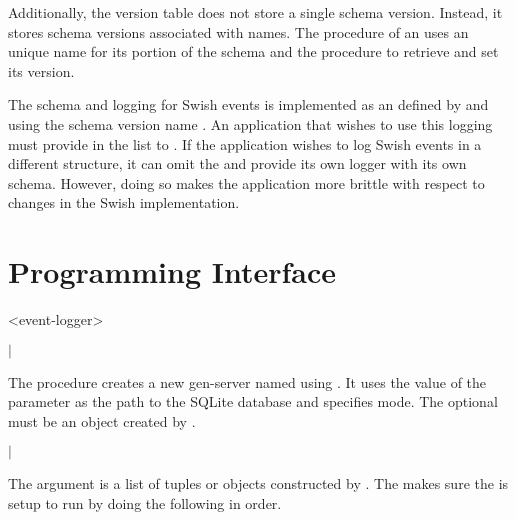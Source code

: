Additionally, the version table does not store a single schema
version. Instead, it stores schema versions associated with names. The
 procedure of an  uses an unique
name for its portion of the schema and the 
procedure to retrieve and set its version.

The schema and logging for Swish events is implemented as an
 defined by  and
using the schema version name . An application that
wishes to use this logging must provide  in
the list to . If the application wishes to log
Swish events in a different structure, it can omit the
 and provide its own logger with its own
schema. However, doing so makes the application more brittle with
respect to changes in the Swish implementation.

\section {Programming Interface}

\begin{tupledef}{<event-logger>}
\end{tupledef}

\begin{procedure}
\end{procedure}
\returns{}
 $|$

The  procedure creates a new 
gen-server named  using . It
uses the value of the  parameter as the path to the
SQLite database and specifies  mode.
The optional  must be an object created by
\hyperref[db:options]{}.

\begin{procedure}
\end{procedure}
\returns{}
 $|$

The argument  is a list of 
tuples or objects constructed by .
The  makes sure the  is
setup to run by doing the following in order.

